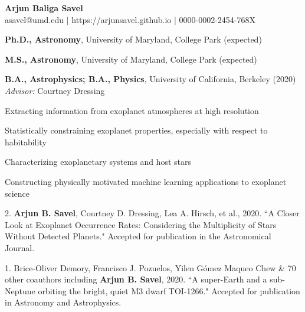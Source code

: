 \documentclass[12pt,letterpaper]{article}
\begin{document}
\thispagestyle{empty}\sloppy\sloppypar\raggedbottom
\centering
\textbf{\Large Arjun Baliga Savel} \hfill \\
\textsf{\small asavel@umd.edu $|$ https://arjunsavel.github.io} $|$ 0000-0002-2454-768X\\
\raggedright

\begin{list}{}{\cvlist}
\item
\textbf{Ph.D., Astronomy}, University of Maryland, College Park (expected)
\item
\textbf{M.S., Astronomy}, University of Maryland, College Park (expected)
\item
\textbf{B.A., Astrophysics; B.A., Physics}, University of California, Berkeley (2020) \\\textit{Advisor:} Courtney Dressing
\end{list}

\begin{list}{}{\cvlist}

\item Extracting information from exoplanet atmospheres at high resolution
\item Statistically constraining exoplanet properties, especially with respect to habitability
\item Characterizing exoplanetary systems and host stars
\item Constructing physically motivated machine learning applications to exoplanet science

\end{list}

\begin{list}{}{\cvlist}

\item 2. \textbf{Arjun B. Savel}, Courtney D. Dressing, Lea A. Hirsch, et al., 2020. ``A Closer Look at Exoplanet Occurrence Rates: Considering the Multiplicity of Stars Without Detected Planets." Accepted for publication in the Astronomical Journal.

\item 1. Brice-Oliver Demory, Francisco J. Pozuelos, Yilen Gómez Maqueo Chew \& 70 other coauthors including \textbf{Arjun B. Savel}, 2020. ``A super-Earth and a sub-Neptune orbiting the bright, quiet M3 dwarf TOI-1266." Accepted for publication in Astronomy and Astrophysics.
\end{list}
\end{document}

